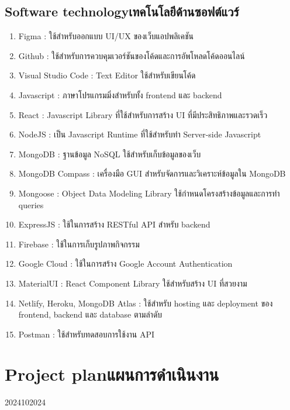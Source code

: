 \subsection{\ifenglish Software technology\else เทคโนโลยีด้านซอฟต์แวร์\fi}
\begin{enumerate}
    \item Figma : ใช้สำหรับออกแบบ UI/UX ของเว็บแอปพลิเคชัน
    \item Github : ใช้สำหรับการควบคุมเวอร์ชันของโค้ดและการอัพโหลดโค้ดออนไลน์
    \item Visual Studio Code : Text Editor ใช้สำหรับเขียนโค้ด
    \item Javascript : ภาษาโปรแกรมมิ่งสำหรับทั้ง frontend และ backend
    \item React : Javascript Library ที่ใช้สำหรับการสร้าง UI ที่มีประสิทธิภาพและรวดเร็ว
    \item NodeJS : เป็น Javascript Runtime ที่ใช้สำหรับทำ Server-side Javascript
    \item MongoDB : ฐานข้อมูล NoSQL ใช้สำหรับเก็บข้อมูลของเว็บ
    \item MongoDB Compass : เครื่องมือ GUI สำหรับจัดการและวิเคราะห์ข้อมูลใน MongoDB
    \item Mongoose : Object Data Modeling Library ใช้กำหนดโครงสร้างข้อมูลและการทำ queries 
    \item ExpressJS : ใช้ในการสร้าง RESTful API สำหรับ backend
    \item Firebase : ใช้ในการเก็บรูปภาพกิจกรรม
    \item Google Cloud : ใช้ในการสร้าง Google Account Authentication
    \item MaterialUI : React Component Library ใช้สำหรับสร้าง UI ที่สวยงาม
    \item Netlify, Heroku, MongoDB Atlas : ใช้สำหรับ hosting และ deployment ของ frontend, backend และ database ตามลำดับ
    \item Postman : ใช้สำหรับทดสอบการใช้งาน API
\end{enumerate}
\section{\ifenglish Project plan\else แผนการดำเนินงาน\fi}

\begin{plan}{6}{2024}{10}{2024}
\end{plan}

